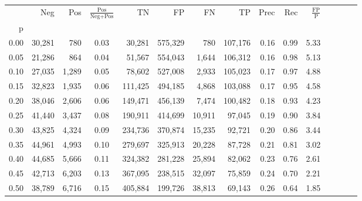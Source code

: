 \begin{tabular}{rrrcrrrrrrrrrrr}
\toprule
{} &     Neg &     Pos & $\frac{\text{Pos}}{\text{Neg}+\text{Pos}}$ &       TN &       FP &       FN &       TP &  Prec &   Rec & $\frac{\text{FP}}{\text{P}}$ \\
p    &         &         &                                            &          &          &          &          &       &       &                              \\
\midrule
0.00 &  30,281 &     780 &                                       0.03 &   30,281 &  575,329 &      780 &  107,176 &  0.16 &  0.99 &                         5.33 \\
0.05 &  21,286 &     864 &                                       0.04 &   51,567 &  554,043 &    1,644 &  106,312 &  0.16 &  0.98 &                         5.13 \\
0.10 &  27,035 &   1,289 &                                       0.05 &   78,602 &  527,008 &    2,933 &  105,023 &  0.17 &  0.97 &                         4.88 \\
0.15 &  32,823 &   1,935 &                                       0.06 &  111,425 &  494,185 &    4,868 &  103,088 &  0.17 &  0.95 &                         4.58 \\
0.20 &  38,046 &   2,606 &                                       0.06 &  149,471 &  456,139 &    7,474 &  100,482 &  0.18 &  0.93 &                         4.23 \\
0.25 &  41,440 &   3,437 &                                       0.08 &  190,911 &  414,699 &   10,911 &   97,045 &  0.19 &  0.90 &                         3.84 \\
0.30 &  43,825 &   4,324 &                                       0.09 &  234,736 &  370,874 &   15,235 &   92,721 &  0.20 &  0.86 &                         3.44 \\
0.35 &  44,961 &   4,993 &                                       0.10 &  279,697 &  325,913 &   20,228 &   87,728 &  0.21 &  0.81 &                         3.02 \\
0.40 &  44,685 &   5,666 &                                       0.11 &  324,382 &  281,228 &   25,894 &   82,062 &  0.23 &  0.76 &                         2.61 \\
0.45 &  42,713 &   6,203 &                                       0.13 &  367,095 &  238,515 &   32,097 &   75,859 &  0.24 &  0.70 &                         2.21 \\
0.50 &  38,789 &   6,716 &                                       0.15 &  405,884 &  199,726 &   38,813 &   69,143 &  0.26 &  0.64 &                         1.85 \\

\end{tabular}
